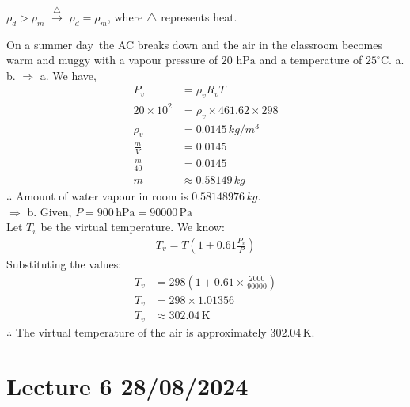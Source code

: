\documentclass[fleqn,10pt]{SelfArx} %
\begin{document}
$\rho_d > \rho_m$ $\xrightarrow{\triangle}$ $\rho_d = \rho_m$, where $\triangle$ represents heat. \\

\begin{question}[label=q:5.1]{On a summer day\, the AC breaks down and the air in the classroom becomes warm and muggy with a vapour pressure of $20 \text{ hPa}$ and a temperature of $25^\circ\text{C}$. \newline
        a.  
        b.  
}
$\Rightarrow$ a. We have, 
        \begin{align*}
            P_v &=\rho_v R_v T \\
            20 \times 10^2 &= \rho_v \times 461.62 \times 298 \\
            \rho_v &= 0.0145 \, kg/m^3 \\
            \frac{m}{V} &= 0.0145 \\
            \frac{m}{40} &= 0.0145 \\
            m &\approx 0.58149 \, kg
        \end{align*}
        $\therefore$ Amount of water vapour in room is $0.58148976 \,  kg$. \\

$\Rightarrow$ b. Given, $P = 900 \, \text{hPa} = 90000 \, \text{Pa} $ \\
        Let $T_v$ be the virtual temperature. We know:
        \begin{align*}
            T_v = T \left(1 + 0.61 \frac{P_v}{P} \right)
        \end{align*}
        Substituting the values:
        \begin{align*}
            T_v &= 298 \left(1 + 0.61 \times \frac{2000}{90000} \right)  \\
            T_v &= 298 \times 1.01356 \\
            T_v &\approx 302.04 \, \text{K}
        \end{align*}
        $\therefore$ The virtual temperature of the air is approximately $ 302.04 \, \text{K} $.
\end{question}

\clearpage

\section{Lecture 6 28/08/2024}
\end{document}
